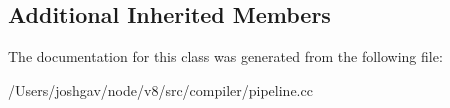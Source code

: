 \subsection*{Additional Inherited Members}


The documentation for this class was generated from the following file\+:\begin{DoxyCompactItemize}
\item 
/\+Users/joshgav/node/v8/src/compiler/pipeline.\+cc\end{DoxyCompactItemize}
